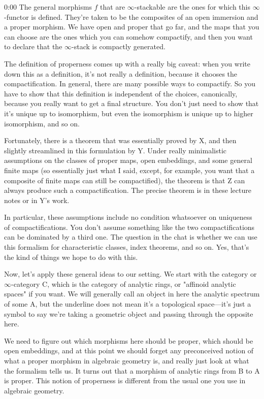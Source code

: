 \begin{unfinished}{0:00}
The general morphisms $f$ that are $\infty$-stackable are the ones for which this $\infty$-functor is defined. They're taken to be the composites of an open immersion and a proper morphism. We have open and proper that go far, and the maps that you can choose are the ones which you can somehow compactify, and then you want to declare that the $\infty$-stack is compactly generated.

The definition of properness comes up with a really big caveat: when you write down this as a definition, it's not really a definition, because it chooses the compactification. In general, there are many possible ways to compactify. So you have to show that this definition is independent of the choices, canonically, because you really want to get a final structure. You don't just need to show that it's unique up to isomorphism, but even the isomorphism is unique up to higher isomorphism, and so on.

Fortunately, there is a theorem that was essentially proved by X, and then slightly streamlined in this formulation by Y. Under really minimalistic assumptions on the classes of proper maps, open embeddings, and some general finite maps (so essentially just what I said, except, for example, you want that a composite of finite maps can still be compactified), the theorem is that Z can always produce such a compactification. The precise theorem is in these lecture notes or in Y's work.

In particular, these assumptions include no condition whatsoever on uniqueness of compactifications. You don't assume something like the two compactifications can be dominated by a third one. The question in the chat is whether we can use this formalism for characteristic classes, index theorems, and so on. Yes, that's the kind of things we hope to do with this.

Now, let's apply these general ideas to our setting. We start with the category or $\infty$-category C, which is the category of analytic rings, or "affinoid analytic spaces" if you want. We will generally call an object in here the analytic spectrum of some A, but the underline does not mean it's a topological space---it's just a symbol to say we're taking a geometric object and passing through the opposite here.

We need to figure out which morphisms here should be proper, which should be open embeddings, and at this point we should forget any preconceived notion of what a proper morphism in algebraic geometry is, and really just look at what the formalism tells us. It turns out that a morphism of analytic rings from B to A is proper. This notion of properness is different from the usual one you use in algebraic geometry.


\end{unfinished}
